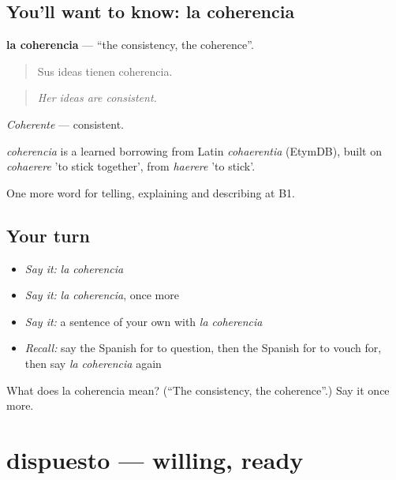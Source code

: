 \subsection*{You'll want to know: la coherencia}
\textbf{la coherencia} — \textquotedblleft{}the consistency, the coherence\textquotedblright{}.

\begin{quote}
Sus ideas tienen coherencia.
\end{quote}

\begin{quote}
\emph{Her ideas are consistent.}
\end{quote}

\emph{Coherente} — consistent.

\begin{cousinweb}
\emph{coherencia} is a learned borrowing from Latin \emph{cohaerentia} (EtymDB), built on \emph{cohaerere} 'to stick together', from \emph{haerere} 'to stick'.
\end{cousinweb}

\begin{grammarlens}[title={What you've built}]
One more word for telling, explaining and describing at B1.
\end{grammarlens}

\subsection*{Your turn}
\begin{itemize}
\raggedright
  \item \emph{Say it:} \emph{la coherencia}
  \item \emph{Say it:} \emph{la coherencia}, once more
  \item \emph{Say it:} a sentence of your own with \emph{la coherencia}
  \item \emph{Recall:} say the Spanish for to question, then the Spanish for to vouch for, then say \emph{la coherencia} again
\end{itemize}

\begin{tcolorbox}[breakable,colback=teal!4,colframe=teal!35!black,title={Before you move on}]
What does la coherencia mean? (\textquotedblleft{}The consistency, the coherence\textquotedblright{}.) Say it once more.
\end{tcolorbox}
\section[dispuesto]{dispuesto — willing, ready}

